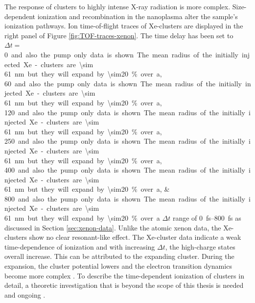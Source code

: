 The response of clusters to highly intense X-ray radiation is more complex. Size-dependent ionization \citep{Schorb-2012-PRL,Schutte-2015-JPhysB} and recombination in the nanoplasma \citep{Schutte-2014-PRL} alter the sample's ionization pathways. Ion time-of-flight traces of Xe-clusters are displayed in the right panel of Figure \ref{fig:TOF-traces-xenon}. The time delay has been set to $\Delta t=$\SIlist{0;60;120;250;400;800} and also the pump only data is shown. The mean radius of the initially injected Xe-clusters are \SI{\sim 61}{\nano\meter} but they will expand by \SI{\sim20}{\percent} over a $\Delta t$ range of \SIrange{0}{800}{\femto\second} as discussed in Section \ref{sec:xenon-data}. Unlike the atomic xenon data, the Xe-clusters show no clear resonant-like effect. The Xe-cluster data indicate a weak time-dependence of ionization and with increasing $\Delta t$, the high-charge states overall increase. This can be attributed to the expanding cluster. During the expansion, the cluster potential lowers \cite{Arbeiter-2011-NJP} and the electron transition dynamics become more complex \cite{Krikunova-2009-NJP}. To describe the time-dependent ionization of clusters in detail, a theoretic investigation that is beyond the scope of this thesis is needed and ongoing \cite{Ho-2016-PC}.

